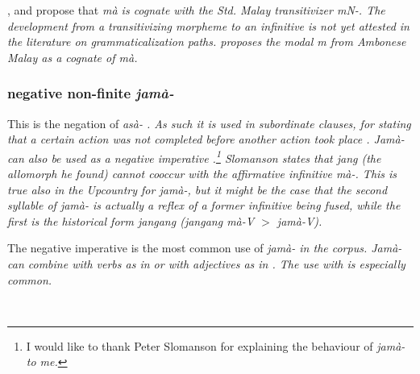 \citet[57f]{Saldin2001}, \citet[173]{SmithEtAl2006cll} and \citet[29]{Ansaldo2008genesis} propose that \em mà \em is cognate with the Std. Malay transitivizer \em m\E N-\em. The development from a transitivizing morpheme to an infinitive is not yet attested in the literature on grammaticalization paths. \citet{Slomanson2006cll}  proposes the modal \em m\ipaO{} \em  from Ambonese Malay as a cognate of \em mà\em.
 
\subsubsection{negative non-finite \em jamà-\em}\label{sec:morph:jama-}
This is the negation of \em asà- \em  \citep{Slomanson2006cll,Slomanson2008lingua}. As such it is used in subordinate clauses, for stating that a certain action was not completed before another action took place . \em Jamà- \em can also be used as a negative imperative .\footnote{I would like to thank Peter Slomanson for explaining the behaviour of \em jamà- \em to me.} Slomanson states that \em jang \em (the allomorph he found) cannot cooccur with the affirmative infinitive \em mà-\em. This is true also in the Upcountry for \em jamà-\em, but it might be the case that the second syllable of \em jamà- \em is actually a reflex of a former infinitive being fused, while the first is the historical form \em jangang \em (\em jangang mà-V $>$ jamà-V\em).

The negative imperative is the most common use of \em jamà- \em in the corpus. \em Jamà- \em can combine with verbs as in  or with adjectives as in . The use with  is especially common.

 \\  


